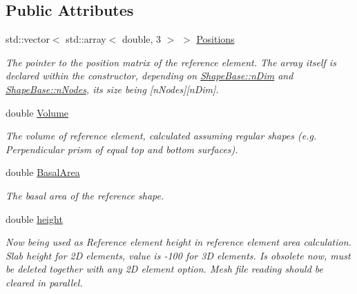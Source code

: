\subsection*{Public Attributes}
\begin{DoxyCompactItemize}
\item 
\hypertarget{classReferenceShapeBase_a6b20aebb733d845a8e2b7cd4f69722cb}{}std\+::vector$<$ std\+::array$<$ double, 3 $>$ $>$ \hyperlink{classReferenceShapeBase_a6b20aebb733d845a8e2b7cd4f69722cb}{Positions}\label{classReferenceShapeBase_a6b20aebb733d845a8e2b7cd4f69722cb}

\begin{DoxyCompactList}\small\item\em The pointer to the position matrix of the reference element. The array itself is declared within the constructor, depending on \hyperlink{classShapeBase_a0ae4246d158f4d66b5bd1644df40f150}{Shape\+Base\+::n\+Dim} and \hyperlink{classShapeBase_a0daa5629b1335ca3e1be089a006fe897}{Shape\+Base\+::n\+Nodes}, its size being \mbox{[}n\+Nodes\mbox{]}\mbox{[}n\+Dim\mbox{]}. \end{DoxyCompactList}\item 
\hypertarget{classReferenceShapeBase_a12d2d0c2511f4f1357360ff61910ac02}{}double \hyperlink{classReferenceShapeBase_a12d2d0c2511f4f1357360ff61910ac02}{Volume}\label{classReferenceShapeBase_a12d2d0c2511f4f1357360ff61910ac02}

\begin{DoxyCompactList}\small\item\em The volume of reference element, calculated assuming regular shapes (e.\+g. Perpendicular prism of equal top and bottom surfaces). \end{DoxyCompactList}\item 
\hypertarget{classReferenceShapeBase_a214b89b970efa7a290dbe1533cf237ea}{}double \hyperlink{classReferenceShapeBase_a214b89b970efa7a290dbe1533cf237ea}{Basal\+Area}\label{classReferenceShapeBase_a214b89b970efa7a290dbe1533cf237ea}

\begin{DoxyCompactList}\small\item\em The basal area of the reference shape. \end{DoxyCompactList}\item 
\hypertarget{classReferenceShapeBase_a76ac694d1b1276f6847bee3c3efa84b0}{}double \hyperlink{classReferenceShapeBase_a76ac694d1b1276f6847bee3c3efa84b0}{height}\label{classReferenceShapeBase_a76ac694d1b1276f6847bee3c3efa84b0}

\begin{DoxyCompactList}\small\item\em Now being used as Reference element height in reference element area calculation. Slab height for 2\+D elements, value is -\/100 for 3\+D elements. Is obsolete now, must be deleted together with any 2\+D element option. Mesh file reading should be cleared in parallel. \end{DoxyCompactList}\end{DoxyCompactItemize}
